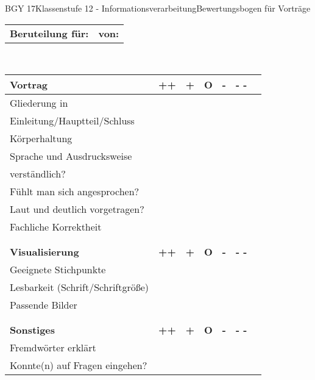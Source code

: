 \documentclass[oneside,openany,headings=optiontotoc,11pt,numbers=noenddot]{scrreprt}
\begin{document}
	\begin{worksheet}{BGY 17}{Klassenstufe 12 - Informationsverarbeitung}{Bewertungsbogen für Vorträge}
				
		\noindent
		\sffamily
		\begin{tabularx}{\textwidth}{Xr}
			\textbf{Beruteilung für:\underline{\color{white}{Gruppenname der Vortragenden}}}\normalcolor & \textbf{von:} \underline{\color{white}{Hier die Namen der Beurteilenden}}
		\end{tabularx}\\
		\par\noindent
		\begin{tabularx}{\textwidth}{|l|M|M|M|M|M|M|}
			\hline
			 \textbf{Vortrag} & \textbf{++} & \textbf{+} & \textbf{O} & \textbf{-} & \textbf{- -}\\
			\hline
			Gliederung in & & & & & \\
			Einleitung/Hauptteil/Schluss & & & & & \\
			\hline
			Körperhaltung & & & & & \\
			\hline
			Sprache und Ausdrucksweise  & & & & & \\
			verständlich?  & & & & & \\
			\hline
			Fühlt man sich angesprochen? & & & & & \\
			\hline
			Laut und deutlich vorgetragen? & & & & & \\
			\hline
			Fachliche Korrektheit & & & & & \\
			\hline
			\\
			\\
			\hline
			 \textbf{Visualisierung} & \textbf{++} & \textbf{+} & \textbf{O} & \textbf{-} & \textbf{- -}\\
			\hline
			Geeignete Stichpunkte & & & & & \\
			\hline
			Lesbarkeit (Schrift/Schriftgröße) & & & & & \\
			\hline
			Passende Bilder & & & & & \\
			\hline
			\\
			\\
			\hline
			 \textbf{Sonstiges} & \textbf{++} & \textbf{+} & \textbf{O} & \textbf{-} & \textbf{- -}\\
			\hline
			Fremdwörter erklärt & & & & & \\
			\hline
			Konnte(n) auf Fragen eingehen? & & & & & \\

\end{tabularx}
\end{worksheet}
\end{document}
